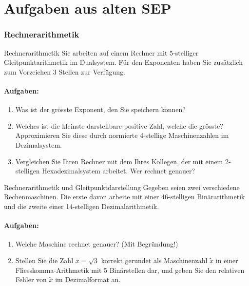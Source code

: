 \section{Aufgaben aus alten SEP}

\subsubsection{Rechnerarithmetik}

\begin{example2}{Rechnerarithmetik}
Sie arbeiten auf einem Rechner mit 5-stelliger Gleitpunktarithmetik im Dualsystem. Für den Exponenten haben Sie zusätzlich zum Vorzeichen 3 Stellen zur Verfügung.

\paragraph{Aufgaben:}
\begin{enumerate}
    \item Was ist der grösste Exponent, den Sie speichern können?
    \item Welches ist die kleinste darstellbare positive Zahl, welche die grösste? Approximieren Sie diese durch normierte 4-stellige Maschinenzahlen im Dezimalsystem.
    \item Vergleichen Sie Ihren Rechner mit dem Ihres Kollegen, der mit einem 2-stelligen Hexadezimalsystem arbeitet. Wer rechnet genauer?
\end{enumerate}
\end{example2}

\begin{example2}{Rechnerarithmetik und Gleitpunktdarstellung}
Gegeben seien zwei verschiedene Rechenmaschinen. Die erste davon arbeite mit einer 46-stelligen Binärarithmetik und die zweite einer 14-stelligen Dezimalarithmetik.

\paragraph{Aufgaben:}
\begin{enumerate}
    \item Welche Maschine rechnet genauer? (Mit Begründung!)
    \item Stellen Sie die Zahl $x = \sqrt{3}$ korrekt gerundet als Maschinenzahl $\tilde{x}$ in einer Fliesskomma-Arithmetik mit 5 Binärstellen dar, und geben Sie den relativen Fehler von $\tilde{x}$ im Dezimalformat an.
\end{enumerate}
\end{example2}

